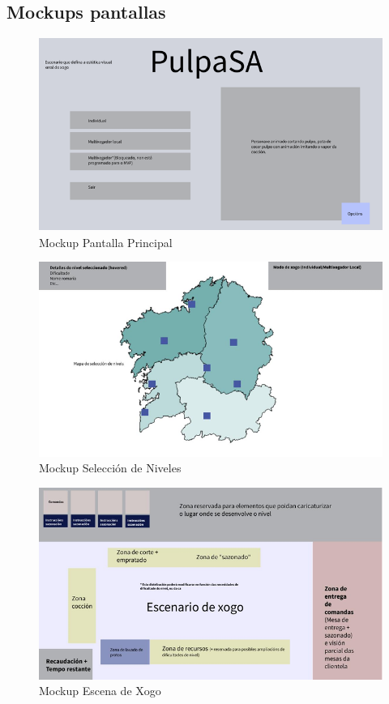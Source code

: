 \documentclass{report}  %
\begin{document}
\subsection{Mockups pantallas}
\begin{figure}[h]
    \centering
    \includegraphics[width=1\textwidth]{images/mockup1.png}
    \caption{Mockup Pantalla Principal}
    \label{fig:Mockup Pantalla Principal}
\end{figure}


\begin{figure}[h]
    \centering
    \includegraphics[width=1\textwidth]{images/mockup2.png}
    \caption{Mockup Selección de Niveles}
    \label{fig:Mockup Selección de Niveles}
\end{figure}


\begin{figure}[h]
    \centering
    \includegraphics[width=1\textwidth]{images/mockup3.png}
    \caption{Mockup Escena de Xogo}
    \label{fig:Mockup Escena de Xogo}
\end{figure}
\end{document}
